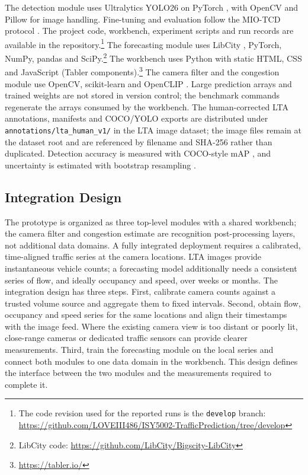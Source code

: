 The detection module uses Ultralytics YOLO26 \parencite{ultralytics2026yolo} on
PyTorch \parencite{paszke2019pytorch}, with OpenCV and Pillow for image handling.
Fine-tuning and evaluation follow the MIO-TCD protocol
\parencite{luo2018miotcd}. The project code, workbench, experiment scripts and
run records are available in the repository.\footnote{The code revision used for
the reported runs is the \texttt{develop} branch:
\url{https://github.com/LOVEIII486/ISY5002-TrafficPrediction/tree/develop}}
The forecasting module uses LibCity \parencite{wang2021libcity,jiang2023libcity},
PyTorch, NumPy, pandas and SciPy.\footnote{LibCity code:
\url{https://github.com/LibCity/Bigscity-LibCity}} The workbench uses Python with
static HTML, CSS and JavaScript (Tabler components).\footnote{\url{https://tabler.io/}}
The camera filter and the congestion module use OpenCV, scikit-learn and
OpenCLIP \parencite{cherti2023openclip}.
Large prediction arrays and trained weights are not stored in version control;
the benchmark commands regenerate the arrays consumed by the workbench. The
human-corrected LTA annotations, manifests and COCO/YOLO exports are distributed
under \texttt{annotations/lta\_human\_v1/} in the LTA image dataset; the image
files remain at the dataset root and are referenced by filename and SHA-256
rather than duplicated. Detection accuracy is measured with COCO-style mAP
\parencite{lin2014coco}, and uncertainty is estimated with bootstrap resampling
\parencite{efron1993bootstrap}.

\subsection{Integration Design}\label{sec:method-integration}

The prototype is organized as three top-level modules with a shared workbench;
the camera filter and congestion estimate are recognition post-processing layers,
not additional data domains. A fully
integrated deployment requires a calibrated, time-aligned traffic series at the
camera locations. LTA images provide instantaneous vehicle counts; a forecasting
model additionally needs a consistent series of flow, and ideally occupancy and
speed, over weeks or months. The integration design has three steps. First,
calibrate camera counts against a trusted volume source and aggregate them to
fixed intervals. Second, obtain flow, occupancy and speed series for the same
locations and align their timestamps with the image feed. Where the existing
camera view is too distant or poorly lit, close-range cameras or dedicated
traffic sensors can provide clearer measurements. Third, train the forecasting
module on the local series and connect both modules to one data domain in the
workbench. This design defines the interface between the two modules
and the measurements required to complete it.
